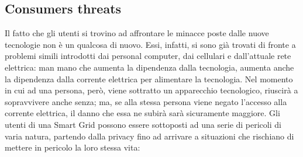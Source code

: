 \subsection{Consumers threats}
Il fatto che gli utenti si trovino ad affrontare le minacce poste dalle nuove tecnologie non è un qualcosa di nuovo. Essi, infatti, si sono già trovati di fronte a problemi simili introdotti dai personal computer, dai  cellulari e dall'attuale rete elettrica: man mano che aumenta la dipendenza dalla tecnologia, aumenta anche la dipendenza dalla corrente elettrica per alimentare la tecnologia. Nel momento in cui ad una persona, però, viene sottratto un apparecchio tecnologico, riuscirà a sopravvivere anche senza; ma, se alla stessa persona viene negato l'accesso alla corrente elettrica, il danno che essa ne subirà sarà sicuramente maggiore.\newline
Gli utenti di una Smart Grid possono essere sottoposti ad una serie di pericoli di varia natura, partendo dalla privacy fino ad arrivare a situazioni che rischiano di mettere in pericolo la loro stessa vita:
